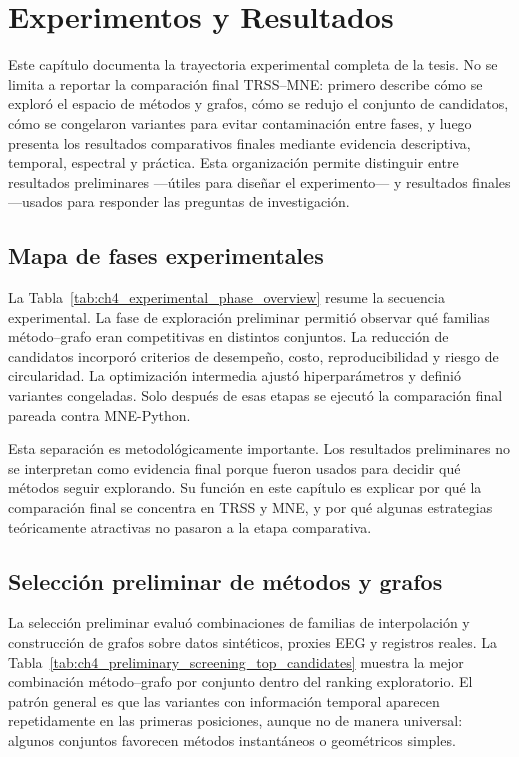 \chapter{Experimentos y Resultados}
\label{ch:resultados}

Este capítulo documenta la trayectoria experimental completa de la tesis. No se limita a reportar la comparación final TRSS--MNE: primero describe cómo se exploró el espacio de métodos y grafos, cómo se redujo el conjunto de candidatos, cómo se congelaron variantes para evitar contaminación entre fases, y luego presenta los resultados comparativos finales mediante evidencia descriptiva, temporal, espectral y práctica. Esta organización permite distinguir entre resultados preliminares —útiles para diseñar el experimento— y resultados finales —usados para responder las preguntas de investigación.

\section{Mapa de fases experimentales}

La Tabla~\ref{tab:ch4_experimental_phase_overview} resume la secuencia experimental. La fase de exploración preliminar permitió observar qué familias método--grafo eran competitivas en distintos conjuntos. La reducción de candidatos incorporó criterios de desempeño, costo, reproducibilidad y riesgo de circularidad. La optimización intermedia ajustó hiperparámetros y definió variantes congeladas. Solo después de esas etapas se ejecutó la comparación final pareada contra MNE-Python.



Esta separación es metodológicamente importante. Los resultados preliminares no se interpretan como evidencia final porque fueron usados para decidir qué métodos seguir explorando. Su función en este capítulo es explicar por qué la comparación final se concentra en TRSS y MNE, y por qué algunas estrategias teóricamente atractivas no pasaron a la etapa comparativa.

\section{Selección preliminar de métodos y grafos}

La selección preliminar evaluó combinaciones de familias de interpolación y construcción de grafos sobre datos sintéticos, proxies EEG y registros reales. La Tabla~\ref{tab:ch4_preliminary_screening_top_candidates} muestra la mejor combinación método--grafo por conjunto dentro del ranking exploratorio. El patrón general es que las variantes con información temporal aparecen repetidamente en las primeras posiciones, aunque no de manera universal: algunos conjuntos favorecen métodos instantáneos o geométricos simples.

